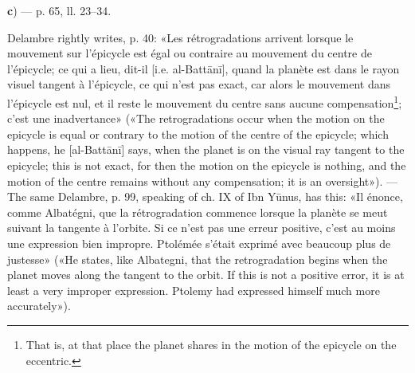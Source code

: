 \documentclass[11pt]{article}
\begin{document}
\par [«\emph{The cause of the retrogradations of the planets is} …». — On a given day let $\Delta l$ be the motion of the planet in longitude on the ecliptic, $\Delta m$ the mean daily motion, $\Delta\varepsilon$ the change of the equation; al-Battānī says that, since $\Delta l = \Delta m + \Delta\varepsilon$, if $\Delta\varepsilon$ is negative and greater than $\Delta m$, then $\Delta l$ too is negative and the planet retrograde. This is the sense of lines 17–19. — What is read afterwards, «if the true place of the planet» as far as l. 24, is a most obscure repetition of the same thing; but I do not know how the passage is to be healed. Let $l$ be the true longitude today and $l + \Delta l$ tomorrow, $m$ the mean motion today and $m + \Delta m$ tomorrow, $\varepsilon$ today's equation and $\varepsilon + \Delta\varepsilon$ tomorrow's; undoubtedly \[ l = m + \varepsilon, \qquad \Delta l = \Delta m + \Delta\varepsilon, \qquad l + \Delta l = m + \Delta m + \varepsilon + \Delta\varepsilon. \] Which of these equalities is indicated in the text I do not understand. — Schiaparelli.]\par
\par\begin{center}\textbf{c}) — p. 65, ll. 23–34.\end{center}
\par Delambre rightly writes, p. 40: «Les rétrogradations arrivent lorsque le mouvement sur l’épicycle est égal ou contraire au mouvement du centre de l’épicycle; ce qui a lieu, dit-il [i.e. al-Battānī], quand la planète est dans le rayon visuel tangent à l’épicycle, ce qui n’est pas exact, car alors le mouvement dans l’épicycle est nul, et il reste le mouvement du centre sans aucune compensation\footnote{That is, at that place the planet shares in the motion of the epicycle on the eccentric.}; c’est une inadvertance» («The retrogradations occur when the motion on the epicycle is equal or contrary to the motion of the centre of the epicycle; which happens, he [al-Battānī] says, when the planet is on the visual ray tangent to the epicycle; this is not exact, for then the motion on the epicycle is nothing, and the motion of the centre remains without any compensation; it is an oversight»). — The same Delambre, p. 99, speaking of ch. IX of Ibn Yūnus, has this: «Il énonce, comme Albatégni, que la rétrogradation commence lorsque la planète se meut suivant la tangente à l’orbite. Si ce n’est pas une erreur positive, c’est au moins une expression bien impropre. Ptolémée s’était exprimé avec beaucoup plus de justesse» («He states, like Albategni, that the retrogradation begins when the planet moves along the tangent to the orbit. If this is not a positive error, it is at least a very improper expression. Ptolemy had expressed himself much more accurately»).\par
\end{document}
